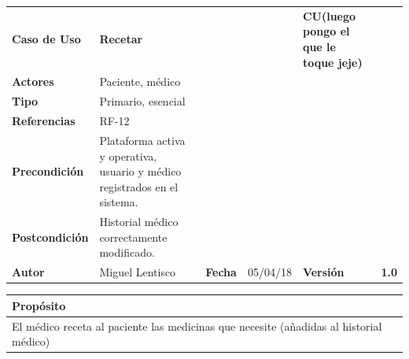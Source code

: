 \documentclass[11pt,a4paper]{article}
\begin{document}


\begin{table}[H]
	\centering
	\begin{tabular}{|l|lllll}
		\cline{1-1} \cline{6-6}
		\textbf{Caso de Uso}   & \textbf{Recetar} &   &  & \multicolumn{1}{l|}{\textbf{\textbf{CU(luego pongo el que le toque jeje)}}}        & \multicolumn{1}{l|}{\textbf{}} \\ \cline{1-1} \cline{6-6} 
		\textbf{Actores}       & Paciente, médico  &                                     &                       &                                       & \textbf{}                      \\ \cline{1-1}
		\textbf{Tipo}          & Primario, esencial  &                                     &                       &                                       & \textbf{}                      \\ \cline{1-1}
		\textbf{Referencias}   & RF-12 &   &                       &                                       & \textbf{}                      \\ \cline{1-1}
		\textbf{Precondición}  & Plataforma activa y operativa, usuario y médico registrados en el sistema.                          &                      &                & \textbf{}                      \\ \cline{1-1}
		\textbf{Postcondición} & Historial médico correctamente modificado.                     &                                     &                       &                                       &                                \\ \cline{1-1} \cline{3-3} \cline{5-5}
		\textbf{Autor}         & \multicolumn{1}{l|}{Miguel Lentisco} & \multicolumn{1}{l|}{\textbf{Fecha}} & \multicolumn{1}{l|}{05/04/18} & \multicolumn{1}{l|}{\textbf{Versión}} & \textbf{1.0}                      \\ \cline{1-1} \cline{3-3} \cline{5-5}
	\end{tabular}
\end{table}

\begin{table}[H]
	\centering
	\begin{tabular}{l}
		\hline
		\multicolumn{1}{|l|}{Propósito} \\ \hline
		El médico receta al paciente las medicinas que necesite (añadidas al historial médico)
	\end{tabular}
\end{table}
\end{document}
